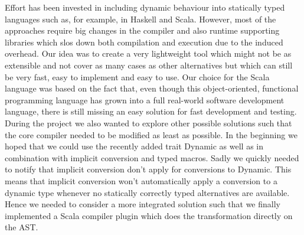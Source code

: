  Effort has been invested in including dynamic behaviour into statically typed languages such as, for example, in Haskell and Scala. However, most of the approaches require big changes in the compiler and also runtime supporting libraries which slos down both compilation and execution due to the induced overhead. Our idea was to create a very lightweight tool which might not be as extensible and not cover as many cases as other alternatives but which can still be very fast, easy to implement and easy to use. Our choice for the Scala language was based on the fact that, even though this object-oriented, functional programming language has grown into a full real-world software development language, there is still missing an easy solution for fast development and testing. During the project we also wanted to explore other possible solutions such that the core compiler needed to be modified as least as possible. In the beginning we hoped that we could use the recently added trait {\ttfamily Dynamic} as well as in combination with implicit conversion and typed macros. Sadly we quickly needed to notify that implicit conversion don't apply for conversions to Dynamic. This means that implicit conversion won't automatically apply a conversion to a dynamic type whenever no statically correctly typed alternatives are available. Hence we needed to consider a more integrated solution such that we finally implemented a Scala compiler plugin which does the transformation directly on the AST.
